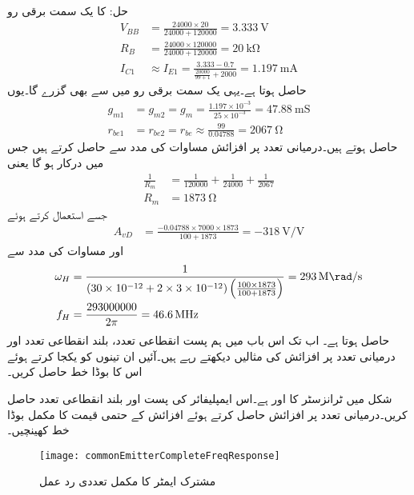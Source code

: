 حل: کا یک سمت  برقی رو 
\begin{align*}
V_{BB}&=\frac{24000 \times 20}{24000+120000}=\SI{3.333}{\volt}\\
R_B&=\frac{24000 \times 120000}{24000+120000}=\SI{20}{\kilo \ohm}\\
I_{C1} &\approx I_{E1}=\frac{3.333-0.7}{\frac{20000}{99+1}+2000}=\SI{1.197}{\milli \ampere}
\end{align*}
حاصل ہوتا ہے۔یہی یک سمت  برقی رو  میں سے بھی گزرے گا۔یوں
\begin{align*}
g_{m1}&=g_{m2}=g_m=\frac{1.197 \times 10^{-3}}{25 \times 10^{-3}}=\SI{47.88}{\milli \siemens}\\
r_{be1}& =r_{be2}=r_{be} \approx \frac{99}{0.04788}=\SI{2067}{\ohm}
\end{align*}
حاصل ہوتے ہیں۔درمیانی تعدد پر افزائش مساوات  کی مدد سے حاصل کرتے ہیں جس میں  درکار ہو گا یعنی
\begin{align*}
\frac{1}{R_m}&=\frac{1}{120000}+\frac{1}{24000}+\frac{1}{2067}\\
R_m&=\SI{1873}{\ohm}
\end{align*}
جسے استعمال کرتے ہوئے
\begin{align*}
A_{vD}&=\frac{-0.04788 \times 7000 \times 1873}{100+1873}=\SI{-318}{\volt \per \volt}
\end{align*}
اور مساوات  کی مدد سے
\begin{align*}
\omega_H&=\frac{1}{\left(30 \times 10^{-12}+2 \times 3 \times 10^{-12} \right) \left(\frac{100 \times 1873}{100+1873} \right)}=\SI{293}{\mega \rad \per \second}\\
f_H&=\frac{293000000}{2 \pi}=\SI{46.6}{\mega \hertz}
\end{align*}
حاصل ہوتا ہے۔
اب تک اس باب میں ہم پست انقطاعی تعدد، بلند انقطاعی تعدد اور درمیانی تعدد پر افزائش کی مثالیں دیکھتے رہے ہیں۔آئیں ان تینوں کو یکجا کرتے ہوئے اس کا بوڈا خط حاصل کریں۔
 
شکل  میں ٹرانزسٹر کا  اور  ہے۔اس ایمپلیفائر کی پست اور بلند انقطاعی تعدد حاصل کریں۔درمیانی تعدد پر افزائش حاصل کرتے ہوئے افزائش کے حتمی قیمت کا مکمل بوڈا خط کھینچیں۔
\begin{figure}
\centering
\texttt{[image: commonEmitterCompleteFreqResponse]}
\caption{مشترک ایمٹر کا مکمل تعددی رد عمل}
\label{شکل_تعددی_ردعمل_مشترک_مخارج_مکمل_تعددی_ردعمل}
\end{figure}

